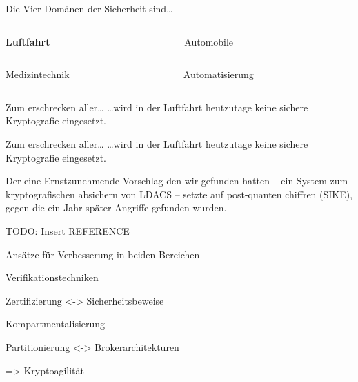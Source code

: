 
\begin{frame}{Die Vier Domänen der Sicherheit sind…}
  \begin{columns}[c]
    \begin{column}{.5\linewidth}
      \textbf{Luftfahrt}
    \end{column}
    \begin{column}{.5\linewidth}
      Automobile
    \end{column}
  \end{columns}
  \vfill
  \begin{columns}[c]
    \begin{column}{.5\linewidth}
      Medizintechnik
    \end{column}
    \begin{column}{.5\linewidth}
      Automatisierung
    \end{column}
  \end{columns}
\end{frame}


\begin{frame}[c]{Zum erschrecken aller…}
  \vspace{15em}
  \footnotesize
  …wird in der Luftfahrt heutzutage keine sichere Kryptografie eingesetzt. 
\end{frame}

\begin{frame}[c]{Zum erschrecken aller…}
  \vspace{10em}
  \footnotesize
  …wird in der Luftfahrt heutzutage keine sichere Kryptografie eingesetzt. 

  \vspace{1em}
  Der eine Ernstzunehmende Vorschlag den wir gefunden hatten -- ein System zum kryptografischen absichern von LDACS --
  setzte auf post-quanten chiffren (SIKE), gegen die ein Jahr später Angriffe gefunden wurden.

  \vspace{1em}
  TODO: Insert REFERENCE
\end{frame}

\begin{frame}[c]{Ansätze für Verbesserung in beiden Bereichen}

  Verifikationstechniken
  \vspace{0.5em}

  {\footnotesize Zertifizierung <-> Sicherheitsbeweise}
  \vspace{1.5em}

  Kompartmentalisierung
  \vspace{0.5em}

  {\footnotesize Partitionierung <-> Brokerarchitekturen}
  \vspace{1.5em}

  => Kryptoagilität
\end{frame}
